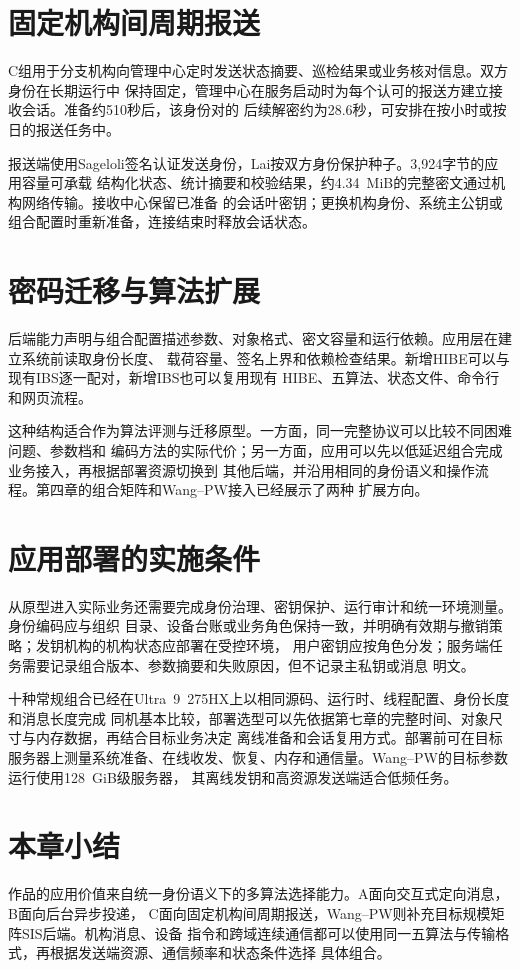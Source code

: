 \section{固定机构间周期报送}

C组用于分支机构向管理中心定时发送状态摘要、巡检结果或业务核对信息。双方身份在长期运行中
保持固定，管理中心在服务启动时为每个认可的报送方建立接收会话。准备约510秒后，该身份对的
后续解密约为28.6秒，可安排在按小时或按日的报送任务中。

报送端使用Sageloli签名认证发送身份，Lai按双方身份保护种子。3,924字节的应用容量可承载
结构化状态、统计摘要和校验结果，约4.34~MiB的完整密文通过机构网络传输。接收中心保留已准备
的会话叶密钥；更换机构身份、系统主公钥或组合配置时重新准备，连接结束时释放会话状态。

\section{密码迁移与算法扩展}

后端能力声明与组合配置描述参数、对象格式、密文容量和运行依赖。应用层在建立系统前读取身份长度、
载荷容量、签名上界和依赖检查结果。新增HIBE可以与现有IBS逐一配对，新增IBS也可以复用现有
HIBE、五算法、状态文件、命令行和网页流程。

这种结构适合作为算法评测与迁移原型。一方面，同一完整协议可以比较不同困难问题、参数档和
编码方法的实际代价；另一方面，应用可以先以低延迟组合完成业务接入，再根据部署资源切换到
其他后端，并沿用相同的身份语义和操作流程。第四章的组合矩阵和Wang--PW接入已经展示了两种
扩展方向。

\section{应用部署的实施条件}

从原型进入实际业务还需要完成身份治理、密钥保护、运行审计和统一环境测量。身份编码应与组织
目录、设备台账或业务角色保持一致，并明确有效期与撤销策略；发钥机构的机构状态应部署在受控环境，
用户密钥应按角色分发；服务端任务需要记录组合版本、参数摘要和失败原因，但不记录主私钥或消息
明文。

十种常规组合已经在Ultra~9~275HX上以相同源码、运行时、线程配置、身份长度和消息长度完成
同机基本比较，部署选型可以先依据第七章的完整时间、对象尺寸与内存数据，再结合目标业务决定
离线准备和会话复用方式。部署前可在目标服务器上测量系统准备、在线收发、恢复、内存和通信量。Wang--PW的目标参数运行使用128~GiB级服务器，
其离线发钥和高资源发送端适合低频任务。

\section{本章小结}

作品的应用价值来自统一身份语义下的多算法选择能力。A面向交互式定向消息，B面向后台异步投递，
C面向固定机构间周期报送，Wang--PW则补充目标规模矩阵SIS后端。机构消息、设备
指令和跨域连续通信都可以使用同一五算法与传输格式，再根据发送端资源、通信频率和状态条件选择
具体组合。
